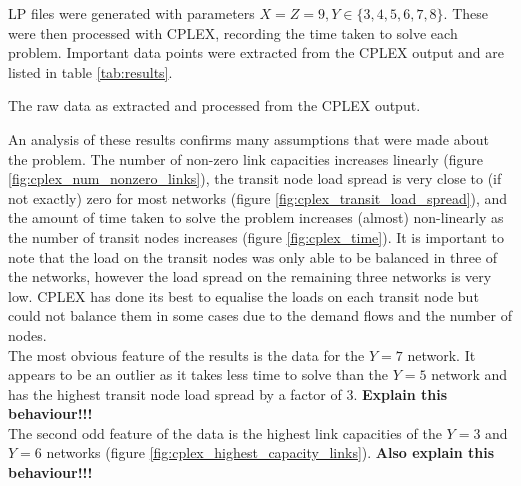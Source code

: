 \documentclass[12pt]{article} %
\begin{document}
LP files were generated with parameters $X = Z = 9, Y \in \{3, 4, 5, 6, 7, 8\}$. These were then processed with CPLEX, recording the time taken to solve each problem. Important data points were extracted from the CPLEX output and are listed in table \ref{tab:results}.

\begin{table}[H]
	\centering
	\caption{The raw data as extracted and processed from the CPLEX output.}
	\label{tab:results}
\end{table}

\noindent An analysis of these results confirms many assumptions that were made about the problem. The number of non-zero link capacities increases linearly (figure \ref{fig:cplex_num_nonzero_links}), the transit node load spread is very close to (if not exactly) zero for most networks (figure \ref{fig:cplex_transit_load_spread}), and the amount of time taken to solve the problem increases (almost) non-linearly as the number of transit nodes increases (figure \ref{fig:cplex_time}). It is important to note that the load on the transit nodes was only able to be balanced in three of the networks, however the load spread on the remaining three networks is very low. CPLEX has done its best to equalise the loads on each transit node but could not balance them in some cases due to the demand flows and the number of nodes. \\

\noindent The most obvious feature of the results is the data for the $Y=7$ network. It appears to be an outlier as it takes less time to solve than the $Y=5$ network and has the highest transit node load spread by a factor of 3. \textbf{Explain this behaviour!!!} \\

\noindent The second odd feature of the data is the highest link capacities of the $Y=3$ and $Y=6$ networks (figure \ref{fig:cplex_highest_capacity_links}). \textbf{Also explain this behaviour!!!}
\end{document}
